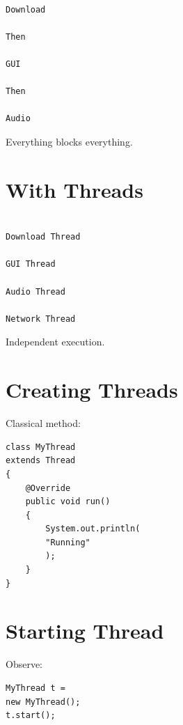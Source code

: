 \documentclass[11pt,a4paper]{book}
\begin{document}
\begin{verbatim}

Download

Then

GUI

Then

Audio

\end{verbatim}


Everything blocks everything.


\section{With Threads}

\begin{verbatim}

Download Thread

GUI Thread

Audio Thread

Network Thread

\end{verbatim}


Independent execution.


\section{Creating Threads}

Classical method:

\begin{verbatim} 
class MyThread
extends Thread
{
    @Override
    public void run()
    {
        System.out.println(
        "Running"
        );
    }
}
\end{verbatim}


\section{Starting Thread}

Observe:

\begin{verbatim} 
MyThread t =
new MyThread();
t.start();
\end{verbatim}
\end{document}
